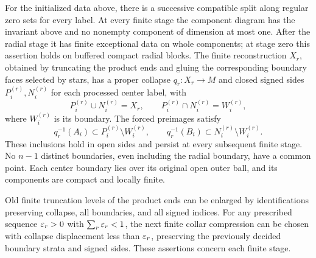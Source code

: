 \begin{proposition}\label{countable:construction}
For the initialized data above, there is a successive compatible
split along regular zero sets for every label. At every finite stage the
component diagram has the invariant above and no nonempty component of
dimension at most one. After the radial stage it has finite exceptional
data on whole components; at stage zero this assertion holds on buffered
compact radial blocks.
The finite reconstruction $X_r$, obtained by truncating the product
ends and gluing the corresponding boundary faces selected by stars, has a proper collapse $q_r:X_r\to M$
and closed signed sides $P_i^{(r)},N_i^{(r)}$ for each processed center
label, with
\[
 P_i^{(r)}\cup N_i^{(r)}=X_r,\qquad
 P_i^{(r)}\cap N_i^{(r)}=W_i^{(r)},
\]
where $W_i^{(r)}$ is its boundary. The forced preimages satisfy
\[
 q_r^{-1}(A_i)\subset P_i^{(r)}\setminus W_i^{(r)},\qquad
 q_r^{-1}(B_i)\subset N_i^{(r)}\setminus W_i^{(r)}.
\]
These inclusions hold in open sides and persist at every subsequent
finite stage. No $n-1$ distinct boundaries, even including the radial boundary,
have a common point. Each center boundary lies over its original open
outer ball, and its components are compact and locally finite.

Old finite truncation levels of the product ends can be
enlarged by identifications preserving collapse,
all boundaries, and all signed indices. For any prescribed sequence
$\varepsilon_r>0$ with $\sum_r\varepsilon_r<1$, the next finite collar compression
can be chosen with collapse displacement less than $\varepsilon_r$, preserving
the previously decided boundary strata and signed sides. These assertions concern each finite stage.
\end{proposition}

